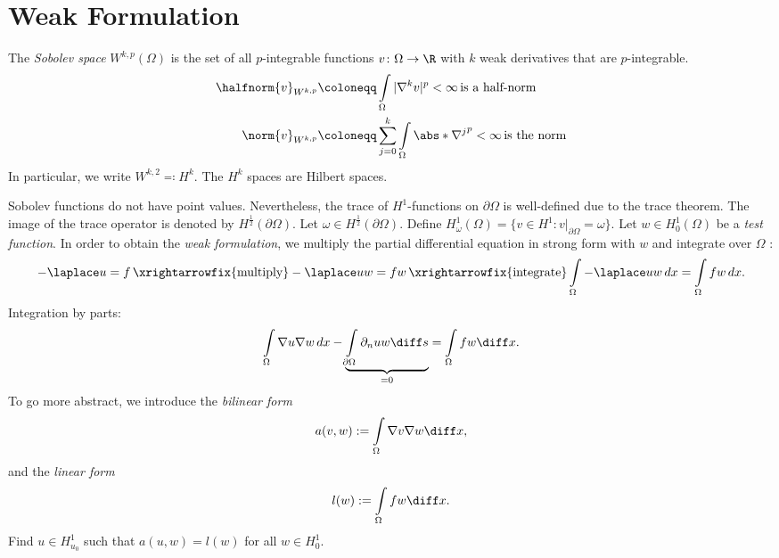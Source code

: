 \section{Weak Formulation}
\begin{definition}
The \textit{Sobolev space} $W^{k,p}(\Omega)$ is the set of all $p$-integrable functions $v\colon\Omega\to\R$ with $k$ weak derivatives that are $p$-integrable.
\begin{align*}
  \halfnorm{v}_{W^{k,p}} &\coloneqq \int\limits_\Omega|\nabla^kv|^p<\infty\,\text{is a half-norm} \\
  \norm{v}_{W^{k,p}} &\coloneqq \sum_{j=0}^k \int\limits_\Omega \abs*{\nabla^j}^p < \infty\, \text{is the norm}
\end{align*}
In particular, we write $W^{k,2}\eqqcolon H^k$. The $H^k$ spaces are Hilbert spaces.
\end{definition}
Sobolev functions do not have point values. Nevertheless, the trace of $H^1$-functions on $\partial\Omega$ is well-defined due to the trace theorem. The image of the trace operator is denoted by $H^{\frac{1}{2}}(\partial\Omega)$. Let $\omega\in H^{\frac{1}{2}}(\partial\Omega)$. Define $H_\omega^1(\Omega)=\{ v\in H^1\colon v|_{\partial\Omega}=\omega\}$. Let $w\in H_0^1(\Omega)$ be a \textit{test function}. In order to obtain the \textit{weak formulation}, we multiply the partial differential equation in strong form with $w$ and integrate over $\Omega$ : 
\begin{equation*}
    -\laplace u=f\, \xrightarrowfix{\text{multiply}}-\laplace uw=fw\,\xrightarrowfix{\text{integrate}}\int\limits_\Omega-\laplace uw\,dx=\int\limits_\Omega fw\,dx.
\end{equation*}
Integration by parts:
\begin{equation*}
    \int\limits_\Omega\nabla u\nabla w\,dx-\underbrace{\int\limits_{\partial\Omega}\partial_{n}uw \diff s}_{=0}=\int\limits_\Omega fw\diff x.
\end{equation*}
To go more abstract, we introduce the \textit{bilinear form}
\begin{equation*}
    a(v,w):=\int\limits_\Omega\nabla v\nabla w\diff x,
\end{equation*}
and the \textit{linear form}
\begin{equation*}
    l(w):=\int\limits_\Omega fw\diff x.
\end{equation*}
Find $u\in H_{u_0}^1$ such that $a(u,w)=l(w)$ for all $w\in H_0^1$.
